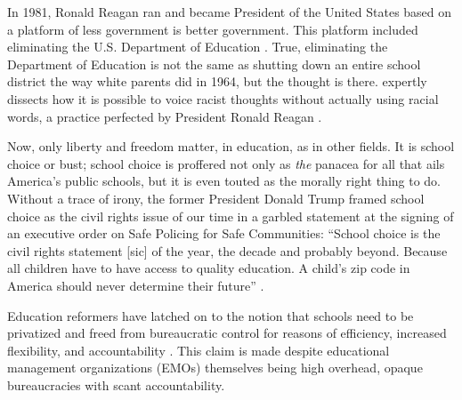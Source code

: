 In 1981, Ronald Reagan ran and became President of the United States based on a platform of less government is better government. This platform included eliminating the U.S. Department of Education \parencite{gop1980}. True, eliminating the Department of Education is not the same as shutting down an entire school district the way white parents did in 1964, but the thought is there. \textcite{Haney-López2014} expertly dissects how it is possible to voice racist thoughts without actually using racial words, a practice perfected by President Ronald Reagan \parencite{Haney-López2014}.

Now, only liberty and freedom matter, in education, as in other fields. It is school choice or bust; school choice is proffered not only as \textit{the} panacea for all that ails America's public schools, but it is even touted as the morally right thing to do. Without a  trace of irony, the former President Donald Trump framed school choice as the civil rights issue of our time in a garbled statement at the signing of an executive order on Safe Policing for Safe Communities: ``School choice is the civil rights statement [sic] of the year, the decade and probably beyond. Because all children have to have access to quality education. A child’s zip code in America should never determine their future'' \parencite[as quoted in][]{Lennox2020}.

Education reformers have latched on to the notion that schools need to be privatized and freed from bureaucratic control for reasons of efficiency, increased flexibility, and accountability \parencite{Garcia2018}. This claim is made despite educational management organizations (EMOs) themselves being high overhead, opaque bureaucracies with scant accountability.

